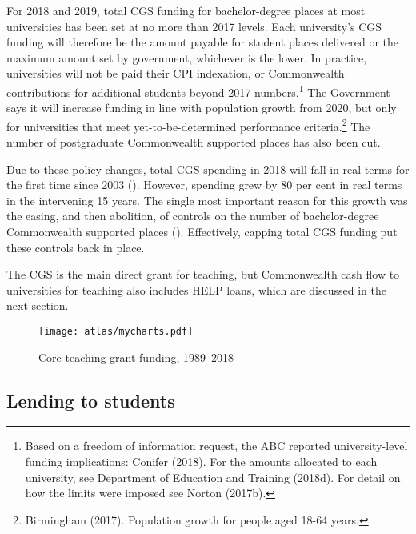 \documentclass{grattan}
\begin{document}
For 2018 and 2019, total CGS funding for bachelor-degree places at most universities has been set at no more than 2017 levels. Each university's CGS funding will therefore be the amount payable for student places delivered or the maximum amount set by government, whichever is the lower. In practice, universities will not be paid their CPI indexation, or Commonwealth contributions for additional students beyond 2017 numbers.\footnote{Based on a freedom of information request, the ABC reported university-level funding implications: Conifer (2018). For the amounts allocated to each university, see Department of Education and Training (2018d). For detail on how the limits were imposed see Norton (2017b).} The Government says it will increase funding in line with population growth from 2020, but only for universities that meet yet-to-be-determined performance criteria.\footnote{Birmingham (2017). Population growth for people aged 18-64 years.} The number of postgraduate Commonwealth supported places has also been cut.

Due to these policy changes, total CGS spending in 2018 will fall in real terms for the first time since 2003 (). However, spending grew by 80 per cent in real terms in the intervening 15 years. The single most important reason for this growth was the easing, and then abolition, of controls on the number of bachelor-degree Commonwealth supported places (). Effectively, capping total CGS funding put these controls back in place.

The CGS is the main direct grant for teaching, but Commonwealth cash flow to universities for teaching also includes HELP loans, which are discussed in the next section.


    \begin{figure} %
    \caption{Core teaching grant funding, 1989--2018}\label{fig:core-teaching-grant-funding-19892018}
    \texttt{[image: atlas/mycharts.pdf]}
    \end{figure}



%
\subsection{Lending to students}\label{subsec:lending-to-students}
\end{document}

